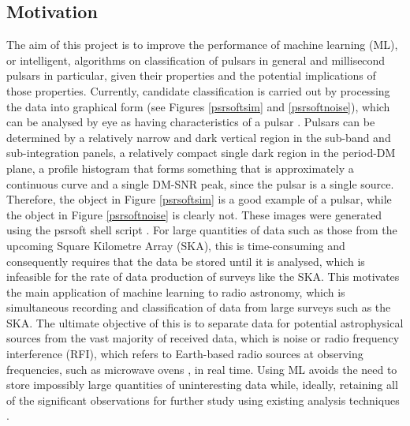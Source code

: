 \documentclass[12pt]{article}
\begin{document}
\subsection{Motivation}
The aim of this project is to improve the performance of machine learning (ML), or intelligent, algorithms on classification of pulsars in general and millisecond pulsars in particular, given their properties and the potential implications of those properties. Currently, candidate classification is carried out by processing the data into graphical form (see Figures \ref{psrsoftsim} and \ref{psrsoftnoise}), which can be analysed by eye as having characteristics of a pulsar \cite{morello2014spinn}. Pulsars can be determined by a relatively narrow and dark vertical region in the sub-band and sub-integration panels, a relatively compact single dark region in the period-DM plane, a profile histogram that forms something that is approximately a continuous curve and a single DM-SNR peak, since the pulsar is a single source. Therefore, the object in Figure \ref{psrsoftsim} is a good example of a pulsar, while the object in Figure \ref{psrsoftnoise} is clearly not. These images were generated using the psrsoft shell script \cite{thornton2013high}. For large quantities of data such as those from the upcoming Square Kilometre Array (SKA), this is time-consuming and consequently requires that the data be stored until it is analysed, which is infeasible for the rate of data production of surveys like the SKA. This motivates the main application of machine learning to radio astronomy, which is simultaneous recording and classification of data from large surveys such as the SKA. The ultimate objective of this is to separate data for potential astrophysical sources from the vast majority of received data, which is noise or radio frequency interference (RFI), which refers to Earth-based radio sources at observing frequencies, such as microwave ovens \cite{petroff2015identifying}, in real time. Using ML avoids the need to store impossibly large quantities of uninteresting data while, ideally, retaining all of the significant observations for further study using existing analysis techniques \cite{smits2009pulsar}.
\end{document}
